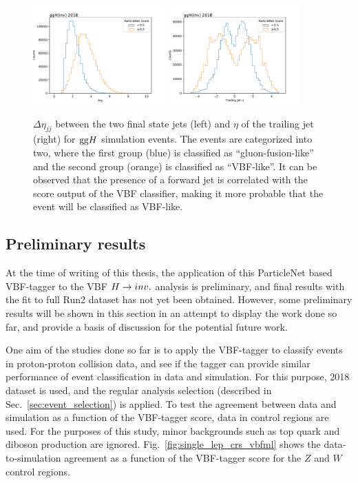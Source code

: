 \begin{figure}[htbp]
    \centering
    \includegraphics[width=0.45\textwidth]{VBFML/ggH_score_overlayed_detajj.pdf}
    \includegraphics[width=0.45\textwidth]{VBFML/ggH_score_overlayed_trailak4_eta.pdf}
    \caption{$\Delta\eta_{jj}$ between the two final state jets (left) and $\eta$ of the trailing jet (right) for $\mathrm{gg}H$ simulation events. 
    The events are categorized into two,
    where the first group (blue) is classified as ``gluon-fusion-like'' and the second group (orange) is classified as ``VBF-like''. It can be observed
    that the presence of a forward jet is correlated with the score output of the VBF classifier, making it more probable 
    that the event will be classified as VBF-like.}
    \label{fig:ggh_dnn_event_kinematics}
    
\end{figure}

\clearpage

\subsection{Preliminary results}

At the time of writing of this thesis, the application of this ParticleNet based VBF-tagger to the VBF $H \rightarrow inv.$ analysis is preliminary, and final
results with the fit to full Run2 dataset has not yet been obtained. However, some preliminary results will be shown in this section in an attempt
to display the work done so far, and provide a basis of discussion for the potential future work.

One aim of the studies done so far is to apply the VBF-tagger to classify events in proton-proton collision data, and see if the tagger can provide
similar performance of event classification in data and simulation. For this purpose, 2018 dataset is used, and the regular analysis selection
(described in Sec.~\ref{sec:event_selection}) is applied. To test the agreement between data and simulation as a function of the VBF-tagger score,
data in control regions are used. For the purposes of this study, minor backgrounds such as top quark and diboson production are ignored.
Fig.~\ref{fig:single_lep_crs_vbfml} shows the data-to-simulation agreement as a function of the VBF-tagger score for the $Z$ and $W$ control regions.

